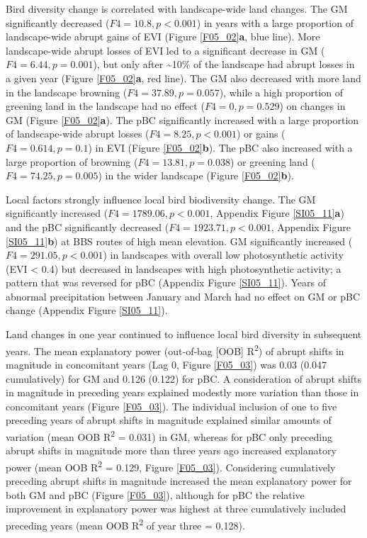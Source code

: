 Bird diversity change is correlated with landscape-wide land changes. The GM significantly decreased ($F4 = 10.8, p < 0.001$) in years with a large proportion of landscape-wide abrupt gains of EVI (Figure \ref{F05_02}\textbf{a}, blue line). More landscape-wide abrupt losses of EVI led to a significant decrease in GM ($F4 = 6.44, p = 0.001$), but only after \textasciitilde 10\% of the landscape had abrupt losses in a given year (Figure \ref{F05_02}\textbf{a}, red line). The GM also decreased with more land in the landscape browning ($F4 = 37.89, p = 0.057$), while a high proportion of greening land in the landscape had no effect ($F4 = 0, p = 0.529$) on changes in GM (Figure \ref{F05_02}\textbf{a}). The pBC significantly increased with a large proportion of landscape-wide abrupt losses ($F4 = 8.25, p < 0.001$) or gains ($F4 = 0.614, p = 0.1$) in EVI (Figure \ref{F05_02}\textbf{b}). The pBC also increased with a large proportion of browning ($F4 = 13.81, p = 0.038$) or greening land ($F4 = 74.25, p = 0.005$) in the wider landscape (Figure \ref{F05_02}\textbf{b}).

Local factors strongly influence local bird biodiversity change. The GM significantly increased ($F4 = 1789.06, p < 0.001$, Appendix Figure \ref{SI05_11}\textbf{a}) and the pBC significantly decreased ($F4 = 1923.71, p < 0.001$, Appendix Figure \ref{SI05_11}\textbf{b}) at BBS routes of high mean elevation. GM significantly increased ($F4 = 291.05, p < 0.001$) in landscapes with overall low photosynthetic activity (EVI < 0.4) but decreased in landscapes with high photosynthetic activity; a pattern that was reversed for pBC (Appendix Figure \ref{SI05_11}). Years of abnormal precipitation between January and March had no effect on GM or pBC change (Appendix Figure \ref{SI05_11}).

Land changes in one year continued to influence local bird diversity in subsequent years. The mean explanatory power (out-of-bag [OOB] R\textsuperscript{2}) of abrupt shifts in magnitude in concomitant years (Lag 0, Figure \ref{F05_03}) was 0.03 (0.047 cumulatively) for GM and 0.126 (0.122) for pBC. A consideration of abrupt shifts in magnitude in preceding years explained modestly more variation than those in concomitant years (Figure \ref{F05_03}). The individual inclusion of one to five preceding years of abrupt shifts in magnitude explained similar amounts of variation (mean OOB R\textsuperscript{2} = 0.031) in GM, whereas for pBC only preceding abrupt shifts in magnitude more than three years ago increased explanatory power (mean OOB R\textsuperscript{2} = 0.129, Figure \ref{F05_03}). Considering cumulatively preceding abrupt shifts in magnitude increased the mean explanatory power for both GM and pBC (Figure \ref{F05_03}), although for pBC the relative improvement in explanatory power was highest at three cumulatively included preceding years (mean OOB R\textsuperscript{2} of year three = 0.128).

